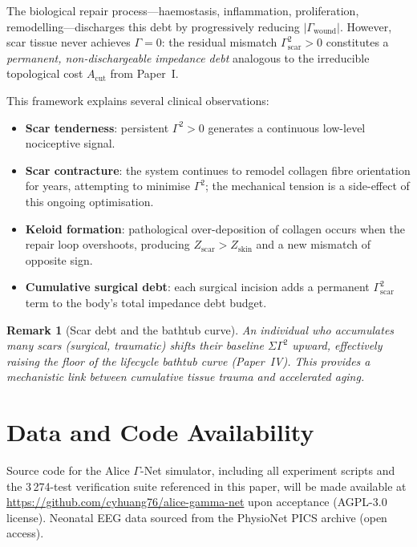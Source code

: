 ﻿\documentclass[aps,pre,twocolumn,superscriptaddress,floatfix]{revtex4-2}
\newtheorem{remark}{Remark}
\begin{document}
The biological repair process---haemostasis, inflammation,
proliferation, remodelling---discharges this debt by
progressively reducing $|\Gamma_{\text{wound}}|$.
However, scar tissue never achieves $\Gamma=0$:
the residual mismatch
$\Gamma_{\text{scar}}^2>0$ constitutes a
\emph{permanent, non-dischargeable impedance debt}
analogous to the irreducible topological cost
$A_{\text{cut}}$ from Paper~I.

This framework explains several clinical observations:
\begin{itemize}
  \item \textbf{Scar tenderness}: persistent $\Gamma^2>0$
    generates a continuous low-level nociceptive signal.
  \item \textbf{Scar contracture}: the system continues
    to remodel collagen fibre orientation for years,
    attempting to minimise $\Gamma^2$; the mechanical
    tension is a side-effect of this ongoing optimisation.
  \item \textbf{Keloid formation}: pathological
    over-deposition of collagen occurs when the repair
    loop overshoots, producing $Z_{\text{scar}}>Z_{\text{skin}}$
    and a new mismatch of opposite sign.
  \item \textbf{Cumulative surgical debt}: each surgical
    incision adds a permanent $\Gamma_{\text{scar}}^2$
    term to the body's total impedance debt budget.
\end{itemize}

\begin{remark}[Scar debt and the bathtub curve]
An individual who accumulates many scars (surgical,
traumatic) shifts their baseline $\Sigma\Gamma^2$
upward, effectively raising the floor of the lifecycle
bathtub curve (Paper~IV).  This provides a mechanistic
link between cumulative tissue trauma and accelerated
aging.
\end{remark}


\section*{Data and Code Availability}
Source code for the Alice $\Gamma$-Net simulator, including all
experiment scripts and the 3\,274-test verification suite
referenced in this paper, will be made available at
\url{https://github.com/cyhuang76/alice-gamma-net}
upon acceptance (AGPL-3.0 license).
Neonatal EEG data sourced from the PhysioNet PICS archive
(open access).
\end{document}
